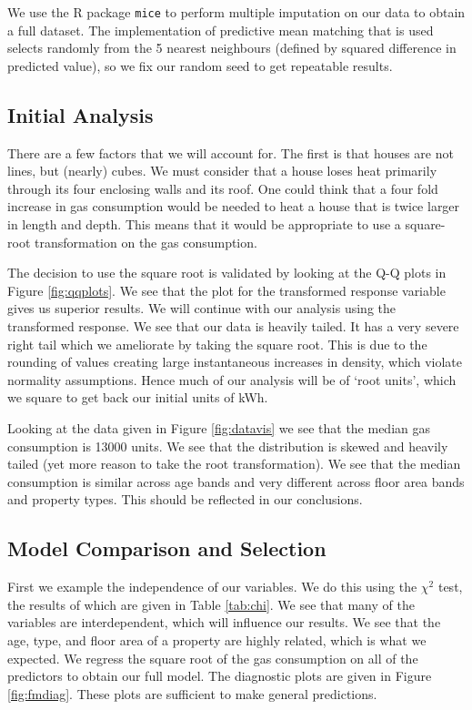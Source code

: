 \documentclass[]{extarticle}
\begin{document}
We use the R package \texttt{mice} to perform multiple imputation on our data to obtain a full dataset. The implementation of predictive mean matching that is used selects randomly from the 5 nearest neighbours (defined by squared difference in predicted value), so we fix our random seed to get repeatable results.

\subsection{Initial Analysis}

There are a few factors that we will account for. The first is that houses are not lines, but (nearly) cubes. We must consider that a house loses heat primarily through its four enclosing walls and its roof. One could think that a four fold increase in gas consumption would be needed to heat a house that is twice larger in length and depth. This means that it would be appropriate to use a square-root transformation on the gas consumption. 

The decision to use the square root is validated by looking at the Q-Q plots in Figure \ref{fig:qqplots}. We see that the plot for the transformed response variable gives us superior results. We will continue with our analysis using the transformed response. We see that our data is heavily tailed. It has a very severe right tail which we ameliorate by taking the square root. This is due to the rounding of values creating large instantaneous increases in density, which violate normality assumptions. Hence much of our analysis will be of `root units', which we square to get back our initial units of kWh.

Looking at the data given in Figure \ref{fig:datavis} we see that the median gas consumption is 13000 units. We see that the distribution is skewed and heavily tailed (yet more reason to take the root transformation). We see that the median consumption is similar across age bands and very different across floor area bands and property types. This should be reflected in our conclusions. 

\subsection{Model Comparison and Selection}
 First we example the independence of our variables. We do this using the $\chi^2$ test, the results of which are given in Table \ref{tab:chi}. We see that many of the variables are interdependent, which will influence our results. We see that the age, type, and floor area of a property are highly related, which is what we expected. We regress the square root of the gas consumption on all of the predictors to obtain our full model. The diagnostic plots are given in Figure \ref{fig:fmdiag}. These plots are sufficient to make general predictions.
\end{document}
